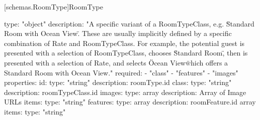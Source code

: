[schemas.RoomType]{RoomType}
\begin{codeblock}
  type: "object"
  description: "A specific variant of a RoomTypeClass, e.g. \"Standard Room with Ocean View\". These are usually implicitly defined by a specific combination of Rate and RoomTypeClass. For example, the potential guest is presented with a selection of RoomTypeClass, chooses \"Standard Room\", then is presented with a selection of Rate, and selects \"Ocean View\" which offers a Standard Room with Ocean View."
  required:
  - "class"
  - "features"
  - "images"
  properties:
    id:
      type: "string"
      description: roomType.id
    class:
      type: "string"
      description: roomTypeClass.id
    images:
      type: array
      description: Array of Image URLs
      items:
        type: "string" 
    features:
      type: array
      description: roomFeature.id array
      items:
         type: "string"
\end{codeblock}

